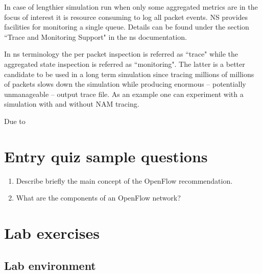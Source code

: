 \documentclass[a4paper]{article}
\begin{document}
In case of lengthier simulation run when only some aggregated metrics are in the focus of interest it is resource consuming to log all packet events. NS provides facilities for monitoring a single queue. Details can be found under the section ``Trace and Monitoring Support" in the ns documentation.

In ns terminology the per packet inspection is referred as ``trace" while the aggregated state inspection is referred as ``monitoring". The latter is a better candidate to be used in a long term simulation since tracing millions of millions of packets slows down the simulation while producing enormous -- potentially unmanageable -- output trace file. As an example one can experiment with a simulation with and without NAM tracing.

Due to 


\appendix

\section{Entry quiz sample questions}

\begin{enumerate}
    \item Describe briefly the main concept of the OpenFlow recommendation.
    \item What are the components of an OpenFlow network?
\end{enumerate}

\section{Lab exercises}

\subsection{Lab environment}
\end{document}
